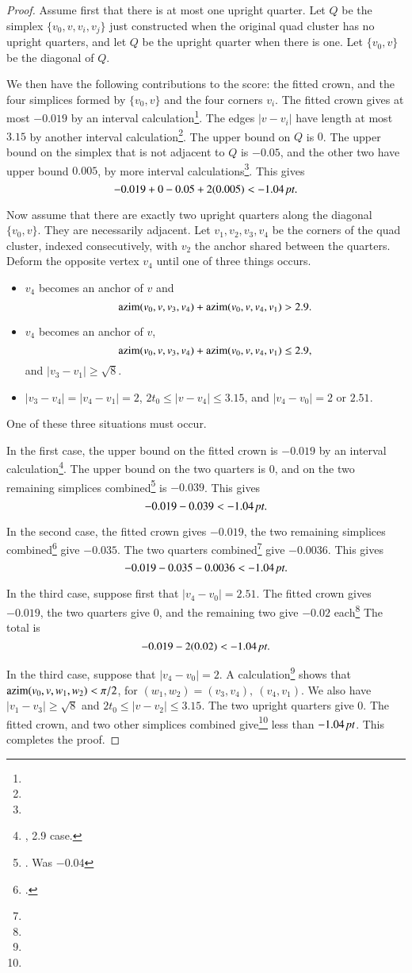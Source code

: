 \begin{proof}
Assume first that there is at most one upright quarter.
Let $Q$ be the simplex $\{v_0,v,v_i,v_j\}$ just constructed when
the original quad cluster has no upright quarters, and let $Q$
be the upright quarter when there is one.  Let $\{v_0,v\}$ be the
diagonal of $Q$.  

We then have the following contributions to the score: the fitted
crown, and the four simplices formed by $\{v_0,v\}$ and the four
corners $v_i$.  The fitted crown gives at most $-0.019$
by an interval calculation\footnote{}.
The  edges $|v-v_i|$  have length at most $3.15$ by another interval
calculation\footnote{}.  The upper bound on $Q$ is $0$.
The upper bound on the simplex that is not adjacent to $Q$ is $-0.05$,
and the other two have upper bound $0.005$, by more interval calculations\footnote{}.  This gives
$$
  -0.019 + 0  - 0.05 +  2 (0.005) < -1.04\,\hbox{\it pt}.
$$

Now assume that there are exactly two upright quarters along the
diagonal $\{v_0,v\}$.  They
are necessarily adjacent.  Let $v_1,v_2,v_3,v_4$ be the corners of
the quad cluster, 
indexed consecutively, with $v_2$ the anchor shared between the
quarters.  Deform the opposite vertex $v_4$ until one of three things
occurs.  
\begin{itemize}
\item $v_4$ becomes an anchor of $v$ and
  $$
  {\operatorname{azim}}(v_0,v,v_3,v_4) + {\operatorname{azim}}(v_0,v,v_4,v_1) > 2.9.
  $$
\item  $v_4$ becomes an anchor of $v$,
  $$
  {\operatorname{azim}}(v_0,v,v_3,v_4) + {\operatorname{azim}}(v_0,v,v_4,v_1)\le 2.9,
  $$
and $|v_3-v_1|\ge \sqrt8$.
\item $|v_3-v_4|=|v_4-v_1|=2$, $2t_0 \le |v-v_4| \le 3.15$, 
and $|v_4-v_0|=2$ or $2.51$.
\end{itemize}
One of these three situations must occur.

In the first case, the upper bound on the fitted crown is
$-0.019$ by an interval calculation\footnote{, 2.9 case.}.
The upper bound on the two quarters is $0$, and on the two remaining
simplices combined\footnote{. Was $-0.04$} is $-0.039$.
This gives
  $$
  -0.019 - 0.039 < -1.04\,\hbox{\it pt}.
  $$

In the second case, the fitted crown gives $-0.019$, the two
remaining simplices combined\footnote{. } give $-0.035$.
The two quarters combined\footnote{} give $-0.0036$.
This gives
   $$
   -0.019 - 0.035 - 0.0036 < -1.04\,\hbox{\it pt}.
   $$

In the third case, suppose first that $|v_4-v_0|=2.51$.  The
fitted crown gives $-0.019$, the two quarters give $0$, and the
remaining two give $-0.02$ each\footnote{}  The
total is
$$
  -0.019 - 2 (0.02) < -1.04\,\hbox{\it pt}.
$$

In the third case, suppose that $|v_4-v_0| =2$.  A calculation\footnote{} shows that ${\operatorname{azim}}(v_0,v,w_1,w_2) < \pi/2$, for $(w_1,w_2)=(v_3,v_4),\ (v_4,v_1)$.  We also have $|v_1-v_3|\ge \sqrt8$ and $2t_0\le |v-v_2|\le 3.15$.
The two upright quarters give $0$.  The fitted crown, and two other
simplices combined give\footnote{} less than $-1.04\,\hbox{\it pt}$.
This completes the proof.
\end{proof}

